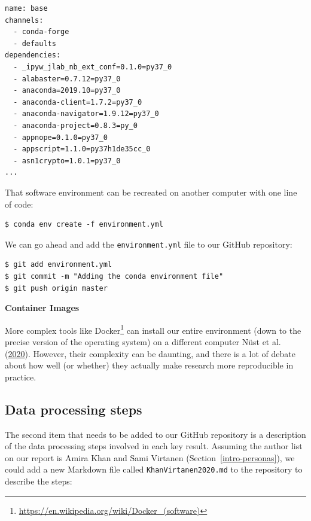 \documentclass[
]{krantz}
\renewenvironment{quote}{\begin{VF}}{\end{VF}}
\renewcommand{\href}[2]{#2\footnote{\url{#1}}}
\begin{document}
\begin{verbatim}
name: base
channels:
  - conda-forge
  - defaults
dependencies:
  - _ipyw_jlab_nb_ext_conf=0.1.0=py37_0
  - alabaster=0.7.12=py37_0
  - anaconda=2019.10=py37_0
  - anaconda-client=1.7.2=py37_0
  - anaconda-navigator=1.9.12=py37_0
  - anaconda-project=0.8.3=py_0
  - appnope=0.1.0=py37_0
  - appscript=1.1.0=py37h1de35cc_0
  - asn1crypto=1.0.1=py37_0
...
\end{verbatim}

That software environment can be recreated on another computer with one line of code:

\begin{verbatim}
$ conda env create -f environment.yml
\end{verbatim}

We can go ahead and add the \texttt{environment.yml} file to our GitHub repository:

\begin{verbatim}
$ git add environment.yml
$ git commit -m "Adding the conda environment file"
$ git push origin master
\end{verbatim}

\begin{quote}
\textbf{Container Images}

More complex tools like \href{https://en.wikipedia.org/wiki/Docker_(software)}{Docker}
can install our entire environment
(down to the precise version of the operating system)
on a different computer Nüst et al. (\protect\hyperlink{ref-Nust2020}{2020}).
However,
their complexity can be daunting,
and there is a lot of debate
about how well (or whether) they actually make research more reproducible in practice.
\end{quote}

\hypertarget{provenance-code-steps}{%
\subsection{Data processing steps}\label{provenance-code-steps}}

The second item that needs to be added to our GitHub repository is a description
of the data processing steps involved in each key result.
Assuming the author list on our report is Amira Khan and Sami Virtanen (Section~\ref{intro-personas}),
we could add a new Markdown file called \texttt{KhanVirtanen2020.md} to the repository
to describe the steps:
\end{document}
